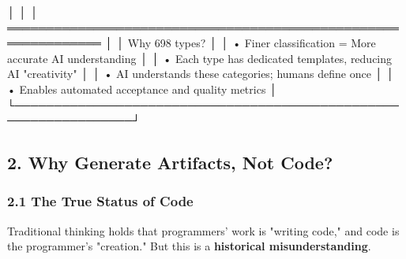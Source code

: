 \documentclass[
]{article}
\newenvironment{Shaded}{}{}
\newcommand{\NormalTok}[1]{#1}
\begin{document}
\begin{Shaded}
\begin{Highlighting}[]
\NormalTok{│                                                                  │}
\NormalTok{│  ══════════════════════════════════════════════════════════════  │}
\NormalTok{│  Why 698 types?                                                 │}
\NormalTok{│  • Finer classification = More accurate AI understanding        │}
\NormalTok{│  • Each type has dedicated templates, reducing AI "creativity"  │}
\NormalTok{│  • AI understands these categories; humans define once          │}
\NormalTok{│  • Enables automated acceptance and quality metrics             │}
\NormalTok{└─────────────────────────────────────────────────────────────────┘}
\end{Highlighting}
\end{Shaded}

\hypertarget{2-why-generate-artifacts-not-code}{%
\subsection{2. Why Generate Artifacts, Not
Code?}\label{2-why-generate-artifacts-not-code}}

\hypertarget{21-the-true-status-of-code}{%
\subsubsection{2.1 The True Status of
Code}\label{21-the-true-status-of-code}}

Traditional thinking holds that programmers' work is "writing code," and
code is the programmer's "creation." But this is a \textbf{historical
misunderstanding}.
\end{document}
